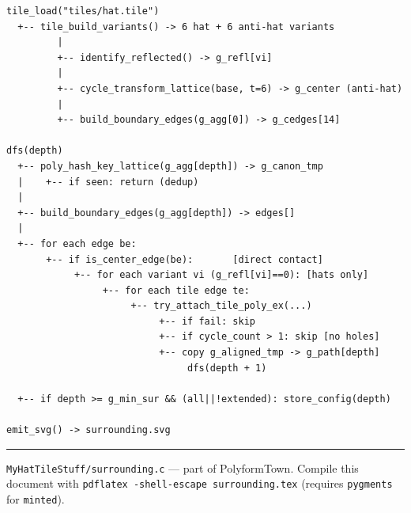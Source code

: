 \documentclass[10pt,a4paper]{article}
\newcommand{\file}[1]{\texttt{\footnotesize #1}}
\begin{document}
\begin{center}
\begin{tcolorbox}[
  colframe=rulecolor, colback=white, boxrule=0.6pt, arc=3pt,
  width=0.96\linewidth
]
\begin{verbatim}
tile_load("tiles/hat.tile")
  +-- tile_build_variants() -> 6 hat + 6 anti-hat variants
         |
         +-- identify_reflected() -> g_refl[vi]
         |
         +-- cycle_transform_lattice(base, t=6) -> g_center (anti-hat)
         |
         +-- build_boundary_edges(g_agg[0]) -> g_cedges[14]

dfs(depth)
  +-- poly_hash_key_lattice(g_agg[depth]) -> g_canon_tmp
  |    +-- if seen: return (dedup)
  |
  +-- build_boundary_edges(g_agg[depth]) -> edges[]
  |
  +-- for each edge be:
       +-- if is_center_edge(be):       [direct contact]
            +-- for each variant vi (g_refl[vi]==0): [hats only]
                 +-- for each tile edge te:
                      +-- try_attach_tile_poly_ex(...)
                           +-- if fail: skip
                           +-- if cycle_count > 1: skip [no holes]
                           +-- copy g_aligned_tmp -> g_path[depth]
                                dfs(depth + 1)

  +-- if depth >= g_min_sur && (all||!extended): store_config(depth)

emit_svg() -> surrounding.svg
\end{verbatim}
\end{tcolorbox}
\end{center}

\vspace{4pt}
\noindent\rule{\linewidth}{0.6pt}
\vspace{2pt}

{\small\color{gray}
\file{MyHatTileStuff/surrounding.c} — part of PolyformTown.
Compile this document with \texttt{pdflatex -shell-escape surrounding.tex}
(requires \texttt{pygments} for \texttt{minted}).
}
\end{document}
